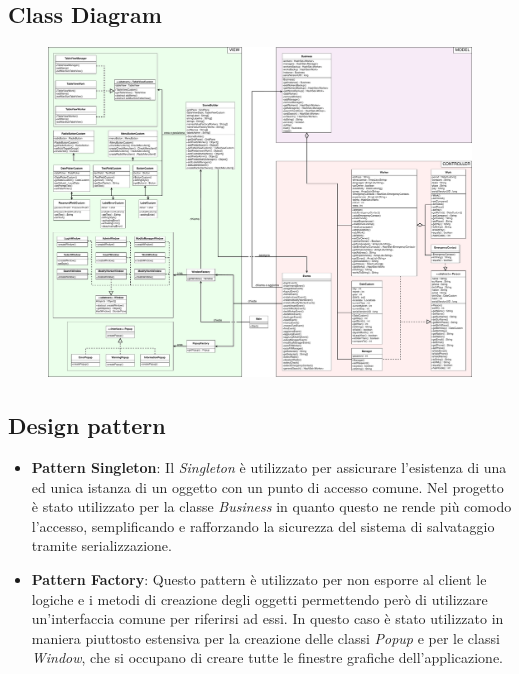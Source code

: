 \documentclass[a4paper,11pt]{article}
\begin{document}
\newpage

\subsection{Class Diagram}

\begin{figure}[htpb]
	\centering
	\hspace*{-2cm}
	\vspace*{-0.5cm}
	\includegraphics[width=1.3\textwidth]{diagrams/Class_Diagram_Vertical.pdf}
	\label{fig:cls_dia}
\end{figure}

\subsection{Design pattern}
\begin{itemize}
	\item \textbf{Pattern Singleton}: Il \emph{Singleton} è utilizzato per
	assicurare l'esistenza di una ed unica istanza di un oggetto con un punto di accesso comune. Nel progetto è stato utilizzato per la classe \emph{Business} in quanto questo ne rende più comodo l'accesso, semplificando e rafforzando la sicurezza del sistema di salvataggio tramite serializzazione.
	\item \textbf{Pattern Factory}: Questo pattern è utilizzato per non esporre al client le logiche e i metodi di creazione degli oggetti permettendo però di utilizzare un'interfaccia comune per riferirsi ad essi. In questo caso è stato utilizzato in maniera piuttosto estensiva per la creazione delle classi \emph{Popup} e per le classi \emph{Window}, che si occupano di creare tutte le finestre grafiche dell'applicazione.
\end{itemize}
\end{document}
